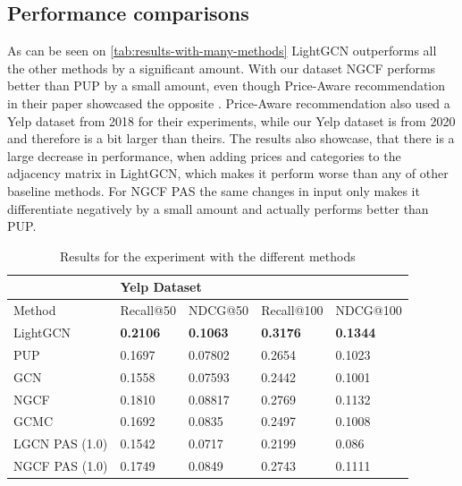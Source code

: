 \subsection{Performance comparisons}
As can be seen on \autoref{tab:results-with-many-methods} LightGCN outperforms all the other methods by a significant amount.
With our dataset NGCF performs better than PUP by a small amount, even though Price-Aware recommendation in their paper showcased the opposite \cite{Priceaware}.
Price-Aware recommendation also used a Yelp dataset from 2018 for their experiments, while our Yelp dataset is from 2020 and therefore is a bit larger than theirs.
The results also showcase, that there is a large decrease in performance, when adding prices and categories to the adjacency matrix in LightGCN, which makes it perform worse than any of other baseline methods.
For NGCF PAS the same changes in input only makes it differentiate negatively by a small amount and actually performs better than PUP.
\begin{table}[h!]
    \centering
    \begin{tabular}{|l|l|l|l|l|}
        \hline
        \rowcolor[HTML]{FFFFFF}
                       & \multicolumn{4}{l|}{\cellcolor[HTML]{FFFFFF}Yelp Dataset}                                                       \\ \hline
        Method         & Recall@50                                                 & NDCG@50         & Recall@100      & NDCG@100        \\ \hline
        LightGCN       & \textbf{0.2106}                                           & \textbf{0.1063} & \textbf{0.3176} & \textbf{0.1344} \\ \hline
        PUP            & 0.1697                                                    & 0.07802         & 0.2654          & 0.1023          \\ \hline
        GCN            & 0.1558                                                    & 0.07593         & 0.2442          & 0.1001          \\ \hline
        NGCF           & 0.1810                                                    & 0.08817         & 0.2769          & 0.1132          \\ \hline
        GCMC           & 0.1692                                                    & 0.0835          & 0.2497          & 0.1008          \\ \hline
        LGCN PAS (1.0) & 0.1542                                                    & 0.0717          & 0.2199          & 0.086           \\ \hline
        NGCF PAS (1.0) & 0.1749                                                    & 0.0849          & 0.2743          & 0.1111          \\ \hline
    \end{tabular}
    \caption{Results for the experiment with the different methods}
    \label{tab:results-with-many-methods}
\end{table}
